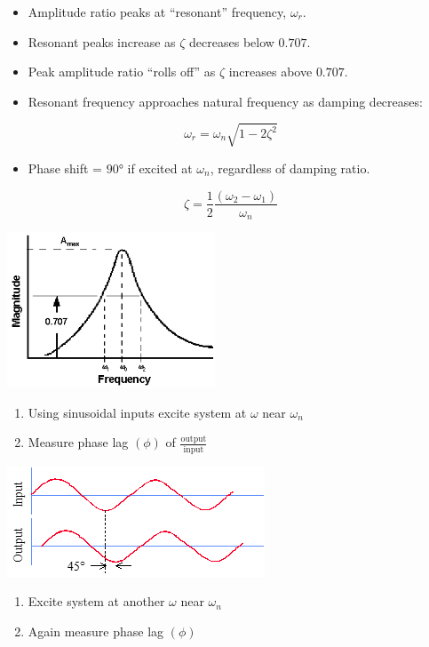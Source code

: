 \documentclass[
]{book}
\providecommand{\tightlist}{%
  \setlength{\itemsep}{0pt}\setlength{\parskip}{0pt}}
\begin{document}
\begin{itemize}
\tightlist
\item
  Amplitude ratio peaks at ``resonant'' frequency, \(\omega_r\).
\item
  Resonant peaks increase as \(\zeta\) decreases below \(0.707\).
\item
  Peak amplitude ratio ``rolls off'' as \(\zeta\) increases above \(0.707\).
\item
  Resonant frequency approaches natural frequency as damping decreases:
\end{itemize}

\[
  \omega_r = \omega_n \sqrt{ 1 - 2 \zeta^2 }
\]

\begin{itemize}
\tightlist
\item
  Phase shift = \(90°\) if excited at \(\omega_n\), regardless of damping ratio.
\end{itemize}

\[
  \zeta = \frac{1}{2} \frac{ \left( \omega_2 - \omega_1 \right) }{\omega_n}
\]

\includegraphics{media/08/image94.png}

\begin{enumerate}
\def\labelenumi{\arabic{enumi}.}
\tightlist
\item
  Using sinusoidal inputs excite system at \(\omega\) near \(\omega_n\)
\item
  Measure phase lag \(\left( \phi \right)\) of \(\frac{\text{output}}{\text{input}}\)
\end{enumerate}

\includegraphics{media/08/image96.png}

\begin{enumerate}
\def\labelenumi{\arabic{enumi}.}
\setcounter{enumi}{2}
\tightlist
\item
  Excite system at another \(\omega\) near \(\omega_n\)
\item
  Again measure phase lag \(\left( \phi \right)\)
\end{enumerate}
\end{document}
